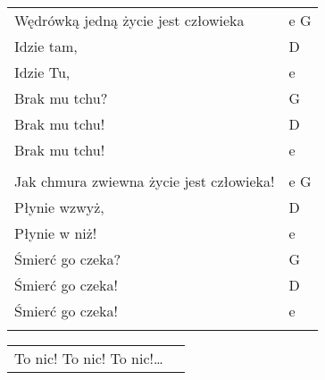 \documentclass[a5paper]{article}
\begin{document}
\noindent
\begin{tabular}{@{}p{7.50cm}p{3cm}@{}}
Wędrówką jedną życie jest człowieka & e G \\
Idzie tam, & D \\
Idzie Tu, & e \\
Brak mu tchu? & G \\
Brak mu tchu! & D \\
Brak mu tchu! & e \\ \\

Jak chmura zwiewna życie jest człowieka! & e G \\
Płynie wzwyż, & D \\
Płynie w niż! & e \\
Śmierć go czeka? & G \\
Śmierć go czeka! & D \\
Śmierć go czeka! & e \\ \\
\end{tabular}

\noindent
\begin{tabular}{@{}p{6.50cm}p{3cm}@{}}
To nic! To nic! To nic!…
\end{tabular}
\end{document}
